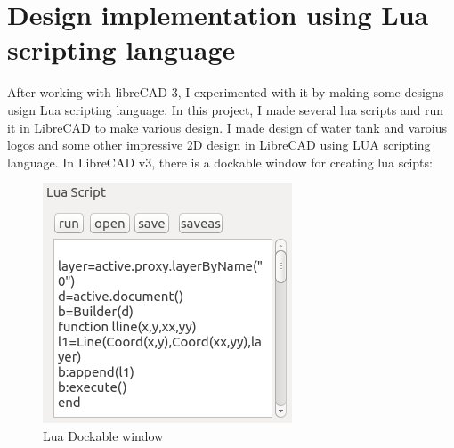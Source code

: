\section{Design implementation using Lua scripting language}
After working with libreCAD 3, I experimented with it by making some designs usign Lua scripting language.
\noindent In this project, I made  several lua scripts and run it in LibreCAD to make various design. I made design of water tank and varoius logos and some other impressive 2D design in LibreCAD using LUA scripting language. 
In LibreCAD v3, there is a dockable window for creating lua scipts:
\begin{figure}[!ht]
\centering
\includegraphics[scale=0.7]{images/lualogo/lua.png}                   
\vspace{-1em}
\caption{Lua Dockable window }
\hspace{-1.5em}
\end{figure}
